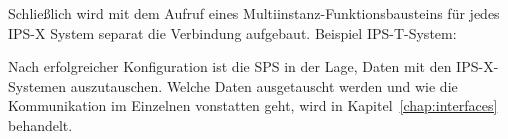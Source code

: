
\pagebreak

Schließlich wird mit dem Aufruf eines Multiinstanz-Funktionsbausteins für jedes IPS-X System separat die Verbindung aufgebaut. Beispiel IPS-T-System:\leer

\leer


Nach erfolgreicher Konfiguration ist die SPS in der Lage, Daten mit den IPS-X-Systemen auszutauschen. Welche Daten ausgetauscht werden und wie die Kommunikation im Einzelnen vonstatten geht, wird in Kapitel~\ref{chap:interfaces} behandelt.

